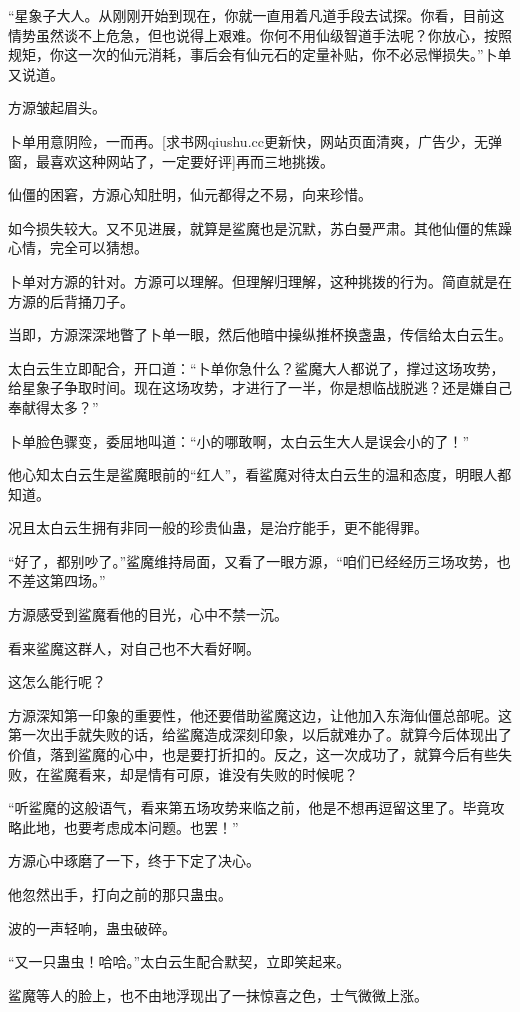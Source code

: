 \begin{this_body}
“星象子大人。从刚刚开始到现在，你就一直用着凡道手段去试探。你看，目前这情势虽然谈不上危急，但也说得上艰难。你何不用仙级智道手法呢？你放心，按照规矩，你这一次的仙元消耗，事后会有仙元石的定量补贴，你不必忌惮损失。”卜单又说道。

方源皱起眉头。

卜单用意阴险，一而再。[求书网qiushu.cc更新快，网站页面清爽，广告少，无弹窗，最喜欢这种网站了，一定要好评]再而三地挑拨。

仙僵的困窘，方源心知肚明，仙元都得之不易，向来珍惜。

如今损失较大。又不见进展，就算是鲨魔也是沉默，苏白曼严肃。其他仙僵的焦躁心情，完全可以猜想。

卜单对方源的针对。方源可以理解。但理解归理解，这种挑拨的行为。简直就是在方源的后背捅刀子。

当即，方源深深地瞥了卜单一眼，然后他暗中操纵推杯换盏蛊，传信给太白云生。

太白云生立即配合，开口道：“卜单你急什么？鲨魔大人都说了，撑过这场攻势，给星象子争取时间。现在这场攻势，才进行了一半，你是想临战脱逃？还是嫌自己奉献得太多？”

卜单脸色骤变，委屈地叫道：“小的哪敢啊，太白云生大人是误会小的了！”

他心知太白云生是鲨魔眼前的“红人”，看鲨魔对待太白云生的温和态度，明眼人都知道。

况且太白云生拥有非同一般的珍贵仙蛊，是治疗能手，更不能得罪。

“好了，都别吵了。”鲨魔维持局面，又看了一眼方源，“咱们已经经历三场攻势，也不差这第四场。”

方源感受到鲨魔看他的目光，心中不禁一沉。

看来鲨魔这群人，对自己也不大看好啊。

这怎么能行呢？

方源深知第一印象的重要性，他还要借助鲨魔这边，让他加入东海仙僵总部呢。这第一次出手就失败的话，给鲨魔造成深刻印象，以后就难办了。就算今后体现出了价值，落到鲨魔的心中，也是要打折扣的。反之，这一次成功了，就算今后有些失败，在鲨魔看来，却是情有可原，谁没有失败的时候呢？

“听鲨魔的这般语气，看来第五场攻势来临之前，他是不想再逗留这里了。毕竟攻略此地，也要考虑成本问题。也罢！”

方源心中琢磨了一下，终于下定了决心。

他忽然出手，打向之前的那只蛊虫。

波的一声轻响，蛊虫破碎。

“又一只蛊虫！哈哈。”太白云生配合默契，立即笑起来。

鲨魔等人的脸上，也不由地浮现出了一抹惊喜之色，士气微微上涨。


\end{this_body}
